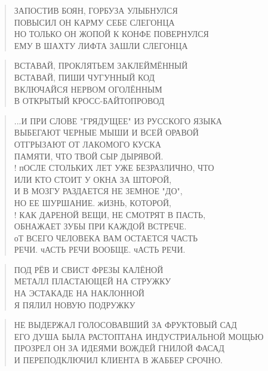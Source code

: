 \poemtitle{***}
\begin{verse}
ЗАПОСТИВ БОЯН, ГОРБУЗА УЛЫБНУЛСЯ\\
ПОВЫСИЛ ОН КАРМУ СЕБЕ СЛЕГОНЦА\\
НО ТОЛЬКО ОН ЖОПОЙ К КОНФЕ ПОВЕРНУЛСЯ\\
ЕМУ В ШАХТУ ЛИФТА ЗАШЛИ СЛЕГОНЦА
\end{verse}

\poemtitle{***}
\begin{verse}
ВСТАВАЙ, ПРОКЛЯТЬЕМ ЗАКЛЕЙМЁННЫЙ\\
ВСТАВАЙ, ПИШИ ЧУГУННЫЙ КОД\\
ВКЛЮЧАЙСЯ НЕРВОМ ОГОЛЁННЫМ\\
В ОТКРЫТЫЙ КРОСС-БАЙТОПРОВОД
\end{verse}

\poemtitle{***}
\begin{verse}
...И ПРИ СЛОВЕ "ГРЯДУЩЕЕ" ИЗ РУССКОГО ЯЗЫКА\\
     ВЫБЕГАЮТ ЧЕРНЫЕ МЫШИ И ВСЕЙ ОРАВОЙ\\
     ОТГРЫЗАЮТ ОТ ЛАКОМОГО КУСКА\\
     ПАМЯТИ, ЧТО ТВОЙ СЫР ДЫРЯВОЙ.\\!
     пОСЛЕ СТОЛЬКИХ ЛЕТ УЖЕ БЕЗРАЗЛИЧНО, ЧТО\\
     ИЛИ КТО СТОИТ У ОКНА ЗА ШТОРОЙ,\\
     И В МОЗГУ РАЗДАЕТСЯ НЕ ЗЕМНОЕ "ДО",\\
     НО ЕЕ ШУРШАНИЕ. жИЗНЬ, КОТОРОЙ,\\!
     КАК ДАРЕНОЙ ВЕЩИ, НЕ СМОТРЯТ В ПАСТЬ,\\
     ОБНАЖАЕТ ЗУБЫ ПРИ КАЖДОЙ ВСТРЕЧЕ.\\
     оТ ВСЕГО ЧЕЛОВЕКА ВАМ ОСТАЕТСЯ ЧАСТЬ\\
     РЕЧИ. чАСТЬ РЕЧИ ВООБЩЕ. чАСТЬ РЕЧИ.
\end{verse}

\poemtitle{***}
\begin{verse}
ПОД РЁВ И СВИСТ ФРЕЗЫ КАЛЁНОЙ\\
МЕТАЛЛ ПЛАСТАЮЩЕЙ НА СТРУЖКУ\\
НА ЭСТАКАДЕ НА НАКЛОННОЙ\\
Я ПЯЛИЛ НОВУЮ ПОДРУЖКУ
\end{verse}

\poemtitle{***}
\begin{verse}
НЕ ВЫДЕРЖАЛ ГОЛОСОВАВШИЙ ЗА ФРУКТОВЫЙ САД\\
ЕГО ДУША БЫЛА РАСТОПТАНА ИНДУСТРИАЛЬНОЙ МОЩЬЮ\\
ПРОЗРЕЛ ОН ЗА ИДЕЯМИ ВОЖДЕЙ ГНИЛОЙ ФАСАД\\
И ПЕРЕПОДКЛЮЧИЛ КЛИЕНТА В ЖАББЕР СРОЧНО.
\end{verse}


